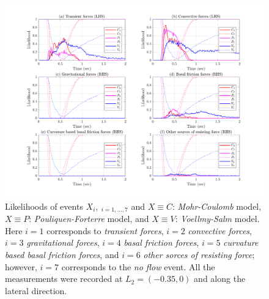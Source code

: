 \documentclass{article}
\begin{document}
\begin{figure}[H]
        \centering
        \includegraphics[width=1\textwidth]{InclinedPlane/LocalRecords/DominancePrY_L2.png}
        \caption{Likelihoods of events $X_i, \ _{i=1,...,7}$ and $X \equiv C$: \emph{Mohr-Coulomb} model, $X \equiv P$: \emph{Pouliquen-Forterre} model, and $X \equiv V$: \emph{Voellmy-Salm} model. Here $i=1$ corresponds to \emph{transient forces}, $i=2$ \emph{convective forces}, $i=3$ \emph{gravitational forces}, $i=4$ \emph{basal friction forces}, $i=5$ \emph{curvature based basal friction forces}, and $i=6$ \emph{other sorces of resisting force}; however, $i=7$ corresponds to the \emph{no flow} event. All the measurements were recorded at $L_2=(-0.35,0)$ and along the lateral direction.}
        \label{fig:Ramp-FYDominance-L2}
\end{figure}
\end{document}
